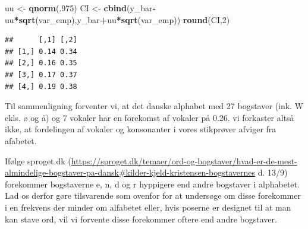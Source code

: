 \documentclass[]{article}
\newenvironment{Shaded}{\begin{snugshade}}{\end{snugshade}}
\newcommand{\KeywordTok}[1]{\textcolor[rgb]{0.13,0.29,0.53}{\textbf{#1}}}
\newcommand{\DecValTok}[1]{\textcolor[rgb]{0.00,0.00,0.81}{#1}}
\newcommand{\StringTok}[1]{\textcolor[rgb]{0.31,0.60,0.02}{#1}}
\newcommand{\CommentTok}[1]{\textcolor[rgb]{0.56,0.35,0.01}{\textit{#1}}}
\newcommand{\OtherTok}[1]{\textcolor[rgb]{0.56,0.35,0.01}{#1}}
\newcommand{\OperatorTok}[1]{\textcolor[rgb]{0.81,0.36,0.00}{\textbf{#1}}}
\newcommand{\NormalTok}[1]{#1}
\begin{document}
\begin{Shaded}
\begin{Highlighting}[]
\NormalTok{uu <-}\StringTok{ }\KeywordTok{qnorm}\NormalTok{(.}\DecValTok{975}\NormalTok{)}
\NormalTok{CI <-}\StringTok{ }\KeywordTok{cbind}\NormalTok{(y_bar}\OperatorTok{-}\NormalTok{uu}\OperatorTok{*}\KeywordTok{sqrt}\NormalTok{(var_emp),y_bar}\OperatorTok{+}\NormalTok{uu}\OperatorTok{*}\KeywordTok{sqrt}\NormalTok{(var_emp))}
\KeywordTok{round}\NormalTok{(CI,}\DecValTok{2}\NormalTok{)}
\end{Highlighting}
\end{Shaded}

\begin{verbatim}
##      [,1] [,2]
## [1,] 0.14 0.34
## [2,] 0.16 0.35
## [3,] 0.17 0.37
## [4,] 0.19 0.38
\end{verbatim}

Til sammenligning forventer vi, at det danske alphabet med 27 bogstaver
(ink. W ekls. ø og å) og 7 vokaler har en forekomst af vokaler på 0.26.
vi forkaster altså ikke, at fordelingen af vokaler og konsonanter i
vores stikprøver afviger fra afabetet.

Ifølge sproget.dk
(\url{https://sproget.dk/temaer/ord-og-bogstaver/hvad-er-de-mest-almindelige-bogstaver-pa-dansk\#kilder-kjeld-kristensen-bogstavernes}
d. 13/9) forekommer bogstaverne e, n, d og r hyppigere end andre
bogstaver i alphabetet. Lad os derfor gøre tilsvarende som ovenfor for
at undersøge om disse forekommer i en frekvens der minder om alfabetet
eller, hvis poserne er designet til at man kan stave ord, vil vi
forvente disse forekommer oftere end andre bogstaver.

\begin{Shaded}
\end{Shaded}
\end{document}
